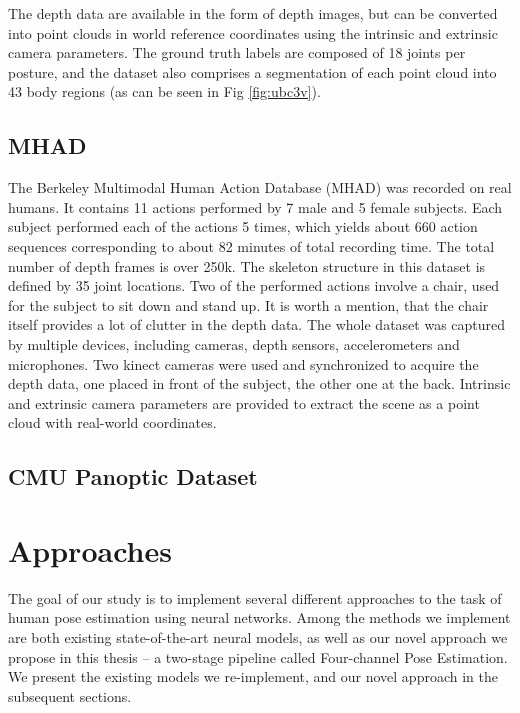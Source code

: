 \noindent
 The depth data are available in the form of depth images, but can be converted into point clouds in world reference coordinates using the intrinsic and extrinsic camera parameters. The ground truth labels are composed of 18 joints per posture, and the dataset also comprises a segmentation of each point cloud into 43 body regions (as can be seen in Fig \ref{fig:ubc3v}).

\subsection{MHAD}
The Berkeley Multimodal Human Action Database (MHAD) \cite{Vidal:2013:BMC:2478277.2478412} was recorded on real humans. It contains 11 actions performed by 7 male and 5 female subjects. Each subject performed each of the actions 5 times, which yields about 660 action sequences corresponding to about 82 minutes of total recording time. The total number of depth frames is over 250k. The skeleton structure in this dataset is defined by 35 joint locations. Two of the performed actions involve a chair, used for the subject to sit down and stand up. It is worth a mention, that the chair itself provides a lot of clutter in the depth data. The whole dataset was captured by multiple devices, including cameras, depth sensors, accelerometers and microphones. Two kinect cameras were used and synchronized to acquire the depth data, one placed in front of the subject, the other one at the back. Intrinsic and extrinsic camera parameters are provided to extract the scene as a point cloud with real-world coordinates.\par

\subsection{CMU Panoptic Dataset}
\cite{Joo_2017_TPAMI}


\section{Approaches}
The goal of our study is to implement several different approaches to the task of human pose estimation using neural networks. Among the methods we implement are both existing state-of-the-art neural models, as well as our novel approach we propose in this thesis – a two-stage pipeline called Four-channel Pose Estimation. We present the existing models we re-implement, and our novel approach in the subsequent sections.

